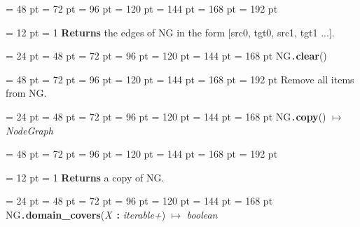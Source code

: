 {{{{\par \noindent  \leftskip = 48 pt  \leftmargini = 72 pt  \leftmarginii = 96 pt  \leftmarginiii = 120 pt  \leftmarginiv = 144 pt  \leftmarginv = 168 pt  \leftmarginvi = 192 pt {\par \noindent
{\par \pagebreak[3.100000] \noindent \hangindent = 12 pt \hangafter = 1 
{\bf Returns \/} the edges of NG in the form {[}src0, tgt0, src1, tgt1 ...].
\par}
\par}
\par}
\par}
\par}
{\par \noindent  \leftskip = 24 pt  \leftmargini = 48 pt  \leftmarginii = 72 pt  \leftmarginiii = 96 pt  \leftmarginiv = 120 pt  \leftmarginv = 144 pt  \leftmarginvi = 168 pt NG{\tt .\/}{\bf {\large {\bf clear\/}}\/}(){\par \noindent
{\par \noindent  \leftskip = 48 pt  \leftmargini = 72 pt  \leftmarginii = 96 pt  \leftmarginiii = 120 pt  \leftmarginiv = 144 pt  \leftmarginv = 168 pt  \leftmarginvi = 192 pt  Remove all items from NG.
\par}
\par}
\par}
{\par \noindent  \leftskip = 24 pt  \leftmargini = 48 pt  \leftmarginii = 72 pt  \leftmarginiii = 96 pt  \leftmarginiv = 120 pt  \leftmarginv = 144 pt  \leftmarginvi = 168 pt NG{\tt .\/}{\bf {\large {\bf copy\/}}\/}() \(\mapsto \)  {\em NodeGraph\/}{\par \noindent
{\par \noindent  \leftskip = 48 pt  \leftmargini = 72 pt  \leftmarginii = 96 pt  \leftmarginiii = 120 pt  \leftmarginiv = 144 pt  \leftmarginv = 168 pt  \leftmarginvi = 192 pt {\par \noindent
{\par \pagebreak[3.100000] \noindent \hangindent = 12 pt \hangafter = 1 
{\bf Returns \/} a copy of NG.
\par}
\par}
\par}
\par}
\par}
{\par \noindent  \leftskip = 24 pt  \leftmargini = 48 pt  \leftmarginii = 72 pt  \leftmarginiii = 96 pt  \leftmarginiv = 120 pt  \leftmarginv = 144 pt  \leftmarginvi = 168 pt NG{\tt .\/}{\bf {\large {\bf domain{\_}covers\/}}\/}({\em X\/}~{\bf :}  {\em iterable+\/}) \(\mapsto \)  {\em boolean\/}{\par \noindent
}}}
